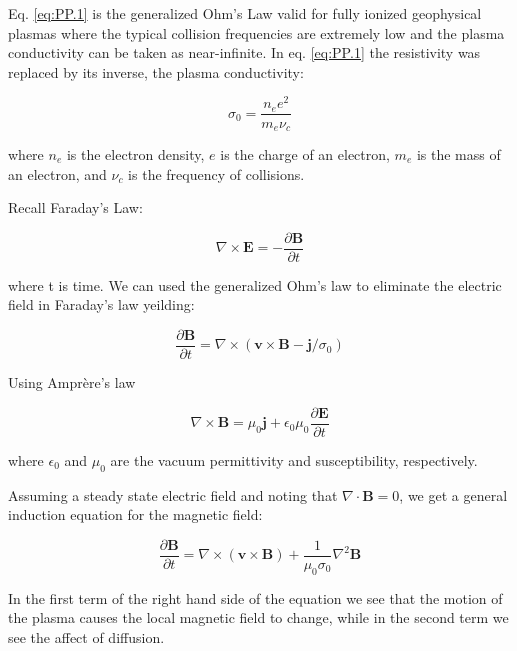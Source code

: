 \documentclass[utf8]{report}
\begin{document}
Eq. \ref{eq:PP.1} is the generalized Ohm's Law valid for fully ionized geophysical plasmas where the typical collision frequencies are extremely low and the plasma conductivity can be taken as near-infinite. In eq. \ref{eq:PP.1} the resistivity was replaced by its inverse, the plasma conductivity: 

\begin{equation}
    \sigma_{0} = \frac{n_{e}e^{2}}{m_{e} \nu_{c}}
    \label{eq:PP.2}
\end{equation}

where $n_{e}$ is the electron density, $e$ is the charge of an electron, $m_{e}$ is the mass of an electron, and $\nu_{c}$ is the frequency of collisions. 

Recall Faraday's Law: 

\begin{equation}
    \nabla\times\textbf{E} = - \frac{\partial\textbf{B}}{\partial t}
    \label{eq:PP.3}
\end{equation}

where t is time. We can used the generalized Ohm's law to eliminate the electric field in Faraday's law yeilding:

\begin{equation}
    \frac{\partial\textbf{B}}{\partial t} = \nabla \times (\textbf{v}\times\textbf{B}-\textbf{j}/\sigma_{0})
    \label{eq:PP.4}
\end{equation}

Using Ampr\`{e}re's law

\begin{equation}
    \nabla\times\textbf{B} = \mu_{0}\textbf{j} + \epsilon_{0}\mu_{0}\frac{\partial \textbf{E}}{\partial t}
\end{equation}

where $\epsilon_{0}$ and $\mu_{0}$  are the vacuum permittivity and susceptibility, respectively. 

Assuming a steady state electric field and noting that $\nabla\cdot\textbf{B} = 0$, we get a general induction equation for the magnetic field:

\begin{equation}
    \frac{\partial \textbf{B}}{\partial t} = \nabla \times (\textbf{v}\times\textbf{B}) + \frac{1}{\mu_{0}\sigma_{0}}\nabla^{2}\textbf{B}
    \label{eq:PP.5}
\end{equation}

In the first term of the right hand side of the equation we see that the motion of the plasma causes the local magnetic field to change, while in the second term we see the affect of diffusion. 
\end{document}

